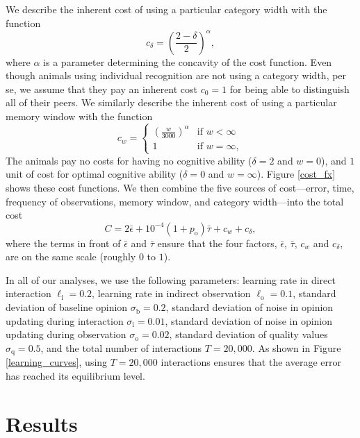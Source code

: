 We describe the inherent cost of using a particular category width with the function
\begin{equation*}
c_\delta = \left(\frac{2-\delta}{2}\right)^\alpha,
\end{equation*}
where $\alpha$ is a parameter determining the concavity of the cost function. 
Even though animals using individual recognition are not using a category width, per se, we assume that they pay an inherent cost $c_0=1$ for being able to distinguish all of their peers.
We similarly describe the inherent cost of using a particular memory window with the function
\begin{equation*}
c_w = \left\{\begin{array}{lll}\left(\frac{w}{3000}\right)^\alpha & \text{if } w<\infty
\\ 1 & \text{if } w=\infty, \end{array}\right.
\end{equation*}
The animals pay no costs for having no cognitive ability ($\delta=2$ and $w=0$), and $1$ unit of cost for optimal cognitive ability ($\delta=0$ and $w=\infty$). Figure \ref{cost_fx} shows these cost functions.
We then combine the five sources of cost---error, time, frequency of observations, memory window, and category width---into the total cost 
\begin{equation*}
C = 2\bar{\epsilon}+10^{-4}(1+p_\text{o})\bar{\tau}+c_w+c_\delta,
\end{equation*}
where the terms in front of $\bar{\epsilon}$ and $\bar{\tau}$ ensure that the four factors, $\bar{\epsilon}$, $\bar{\tau}$, $c_w$ and $c_\delta$, are on the same scale (roughly $0$ to $1$). 

In all of our analyses, we use the following parameters: learning rate in direct interaction $\ell_\text{i}=0.2$, learning rate in indirect observation $\ell_\text{o}=0.1$, standard deviation of baseline opinion $\sigma_\text{b}=0.2$, standard deviation of noise in opinion updating during interaction $\sigma_\text{i}=0.01$, standard deviation of noise in opinion updating during observation $\sigma_\text{o}=0.02$, standard deviation of quality values $\sigma_\text{q}=0.5$, and the total number of interactions $T=20,000$. As shown in Figure \ref{learning_curves}, using $T=20,000$ interactions ensures that the average error has reached its equilibrium level.



\section*{Results}
%
